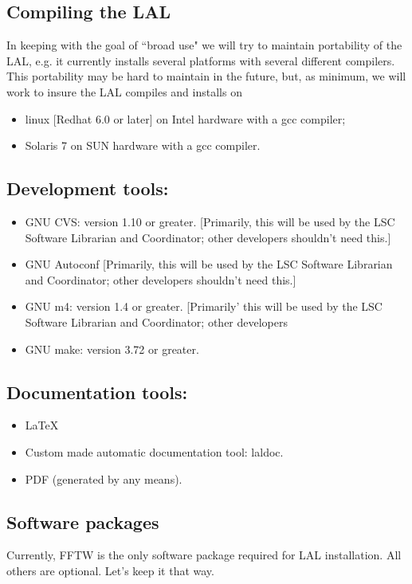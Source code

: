 \documentclass[]{ligodcc}
\begin{document}
\subsection{Compiling the LAL}

In keeping with the goal of ``broad use" we will try to maintain
portability of the LAL, e.g. it currently installs several platforms
with several different compilers.  This portability may be hard to
maintain in the future, but, as minimum, we will work to insure the
LAL compiles and installs on

\begin{itemize}
\item
linux [Redhat 6.0 or later] on Intel hardware with a gcc compiler;
\item
Solaris 7 on SUN hardware with a gcc compiler.
\end{itemize}

\subsection{Development tools:}

\begin{itemize}
\item
GNU CVS: version 1.10 or greater. [Primarily, this will be
used by the LSC Software Librarian and Coordinator; other developers
shouldn't need this.]
\item
GNU Autoconf [Primarily, this will be used by the LSC Software
Librarian and Coordinator; other developers shouldn't need this.]
\item
GNU m4: version 1.4 or greater. [Primarily' this will be used
by the LSC Software Librarian and Coordinator; other developers
\item
GNU make: version 3.72 or greater.
\end{itemize}


\subsection{Documentation tools:}
\begin{itemize}
   \item
   LaTeX
   \item
   Custom made automatic documentation tool: laldoc.
   \item
   PDF (generated by any means).
\end{itemize}


\subsection{Software packages}
Currently, FFTW is the only software package required for LAL
installation. All others are optional. Let's keep it  that way.
\end{document}
